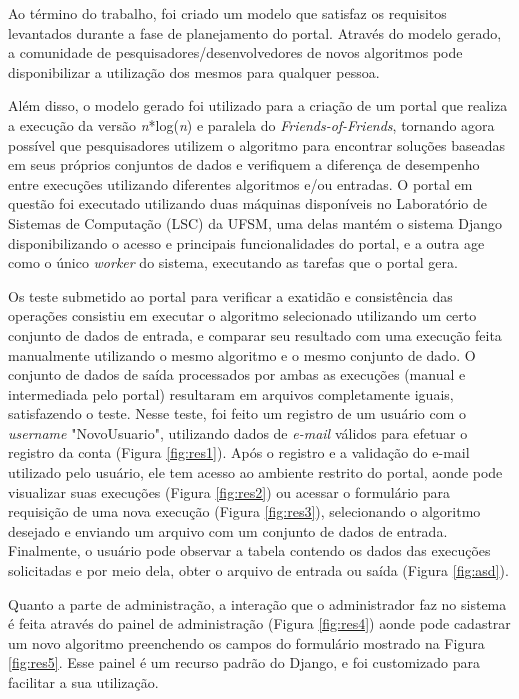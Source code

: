 \documentclass[tg]{mdtufsm}
\begin{document}
Ao término do trabalho, foi criado um modelo que satisfaz os requisitos levantados durante a fase de planejamento do portal. Através do modelo gerado, a comunidade de pesquisadores/desenvolvedores de novos algoritmos pode disponibilizar a utilização dos mesmos para qualquer pessoa.

Além disso, o modelo gerado foi utilizado para a criação de um portal que realiza a execução da versão \emph{n}*log(\emph{n}) e paralela do \emph{Friends-of-Friends}, tornando agora possível que pesquisadores utilizem o algoritmo para encontrar soluções baseadas em seus próprios conjuntos de dados e verifiquem a diferença de desempenho entre execuções utilizando diferentes algoritmos e/ou entradas. O portal em questão foi executado utilizando duas máquinas disponíveis no Laboratório de Sistemas de Computação (LSC) da UFSM, uma delas mantém o sistema Django disponibilizando o acesso e principais funcionalidades do portal, e a outra age como o único \emph{worker} do sistema, executando as tarefas que o portal gera.

Os teste submetido ao portal para verificar a exatidão e consistência das operações consistiu em executar o algoritmo selecionado utilizando um certo conjunto de dados de entrada, e comparar seu resultado com uma execução feita manualmente utilizando o mesmo algoritmo e o mesmo conjunto de dado. O conjunto de dados de saída processados por ambas as execuções (manual e intermediada pelo portal) resultaram em arquivos completamente iguais, satisfazendo o teste. Nesse teste, foi feito um registro de um usuário com o \emph{username} "NovoUsuario", utilizando dados de \emph{e-mail} válidos para efetuar o registro da conta (Figura \ref{fig:res1}). Após o registro e a validação do e-mail utilizado pelo usuário, ele tem acesso ao ambiente restrito do portal, aonde pode visualizar suas execuções (Figura \ref{fig:res2}) ou acessar o formulário para requisição de uma nova execução (Figura \ref{fig:res3}), selecionando o algoritmo desejado e enviando um arquivo com um conjunto de dados de entrada. Finalmente, o usuário pode observar a tabela contendo os dados das execuções solicitadas e por meio dela, obter o arquivo de entrada ou saída (Figura \ref{fig:asd}).

Quanto a parte de administração, a interação que o administrador faz no sistema é feita através do painel de administração (Figura \ref{fig:res4}) aonde pode cadastrar um novo algoritmo preenchendo os campos do formulário mostrado na Figura \ref{fig:res5}. Esse painel é um recurso padrão do Django, e foi customizado para facilitar a sua utilização.
\end{document}
